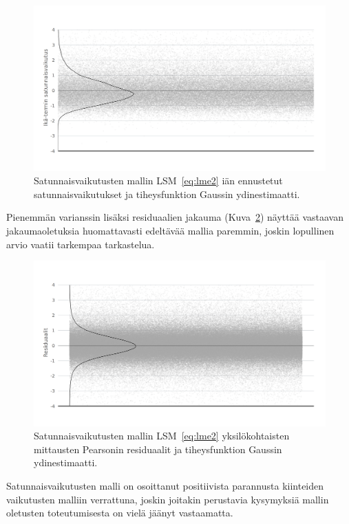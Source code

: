 \documentclass[finnish]{docopts}
\begin{document}
\begin{figure}[H]
\centering
  \includegraphics[scale=0.8]{kuvaajat/lme2_ika_satunnaisvaikutukset.png}
  \caption{Satunnaisvaikutusten mallin LSM~\ref{eq:lme2} iän ennustetut satunnaisvaikutukset ja tiheysfunktion Gaussin ydinestimaatti.}
  \label{fig:lme2_ika_ranef}
\end{figure}

Pienemmän varianssin lisäksi residuaalien jakauma (Kuva~\ref{fig:lme2_resid}) näyttää vastaavan jakaumaoletuksia huomattavasti edeltävää mallia paremmin, joskin lopullinen arvio vaatii tarkempaa tarkastelua.\\

\begin{figure}[H]
\centering
  \includegraphics[scale=0.8]{kuvaajat/lme2_residuaalit.png}
  \caption{Satunnaisvaikutusten mallin LSM~\ref{eq:lme2} yksilökohtaisten mittausten Pearsonin residuaalit ja tiheysfunktion Gaussin ydinestimaatti.}
  \label{fig:lme2_resid}
\end{figure}

Satunnaisvaikutusten malli on osoittanut positiivista parannusta kiinteiden vaikutusten malliin verrattuna, joskin joitakin perustavia kysymyksiä mallin oletusten toteutumisesta on vielä jäänyt vastaamatta.\\
\end{document}
